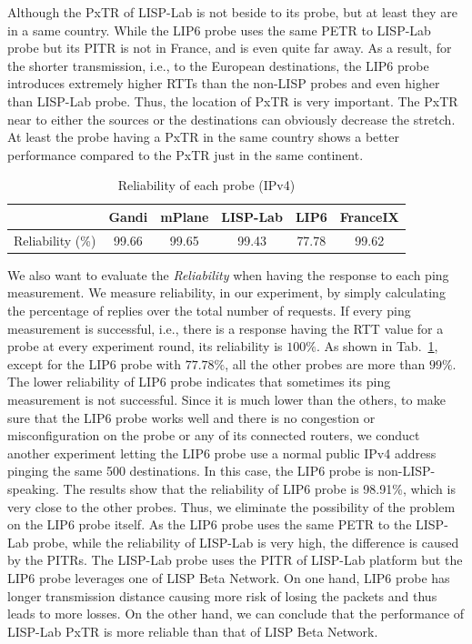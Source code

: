 Although the PxTR of LISP-Lab is not beside to its probe, but at least they are in a same country. While the LIP6 probe uses the same PETR to LISP-Lab probe but its PITR is not in France, and is even quite far away. As a result, for the shorter transmission, i.e., to the European destinations, the LIP6 probe introduces extremely higher RTTs than the non-LISP probes and even higher than LISP-Lab probe. Thus, the location of PxTR is very important. The PxTR near to either the sources or the destinations can obviously decrease the stretch. At least the probe having a PxTR in the same country shows a better performance compared to the PxTR just in the same continent.

\begin{table}[!tb]
	\centering
	\caption{Reliability of each probe (IPv4)}
	\label{reliability_v4_2016}{
		\begin{tabular}{@{}c|c|c|c|c|c@{}}
			\hline\hline
			& Gandi  & mPlane  & LISP-Lab  & LIP6 &  FranceIX \\ \hline
			Reliability (\%) &  99.66 & 99.65 & 99.43 & 77.78 & 99.62     	\\  \hline\hline                 
		\end{tabular}
	}
\end{table}


We also want to evaluate the \emph{Reliability} when having the response to each ping measurement. We measure reliability, in our experiment, by simply calculating the percentage of replies over the total number of requests. If every ping measurement is successful, i.e., there is a response having the RTT value for a probe at every experiment round, its reliability is $100\%$. As shown in Tab.~\ref{reliability_v4_2016}, except for the LIP6 probe with $77.78\%$, all the other probes are more than $99\%$. The lower reliability of LIP6 probe indicates that sometimes its ping measurement is not successful. Since it is much lower than the others, to make sure that the LIP6 probe works well and there is no congestion or misconfiguration on the probe or any of its connected routers, we conduct another experiment letting the LIP6 probe use a normal public IPv4 address pinging the same 500 destinations. In this case, the LIP6 probe is non-LISP-speaking. The results show that the reliability of LIP6 probe is 98.91\%, which is very close to the other probes. Thus, we eliminate the possibility of the problem on the LIP6 probe itself. As the LIP6 probe uses the same PETR to the LISP-Lab probe, while the reliability of LISP-Lab is very high, the difference is caused by the PITRs. The LISP-Lab probe uses the PITR of LISP-Lab platform but the LIP6 probe leverages one of LISP Beta Network. On one hand, LIP6 probe has longer transmission distance causing more risk of losing the packets and thus leads to more losses. On the other hand, we can conclude that the performance of LISP-Lab PxTR is more reliable than that of LISP Beta Network.

